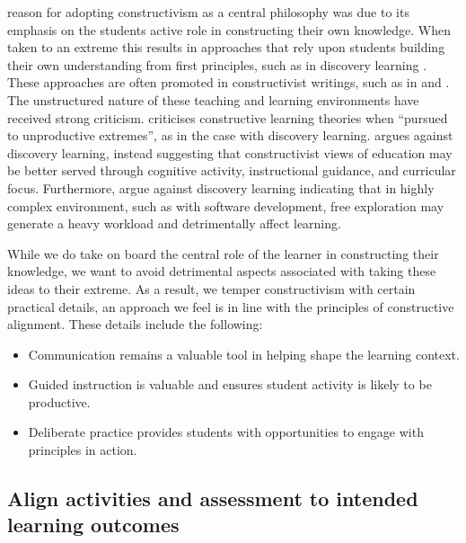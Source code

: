 \citet{Biggs:1996c} reason for adopting constructivism as a central philosophy was due to its emphasis on the students active role in constructing their own knowledge. When taken to an extreme this results in approaches that rely upon students building their own understanding from first principles, such as in discovery learning \cite{Bruner:1961}. These approaches are often promoted in constructivist writings, such as in \citet{Glasersfeld:1989} and \citet{Cunningham:1996}. The unstructured nature of these teaching and learning environments have received strong criticism. \citet{Anderson:1998} criticises constructive learning theories when ``pursued to unproductive extremes'', as in the case with discovery learning. \citet{Mayer:2004} argues against discovery learning, instead suggesting that constructivist views of education may be better served through cognitive activity, instructional guidance, and curricular focus. Furthermore, \citet{Kirschner:2006} argue against discovery learning indicating that in highly complex environment, such as with software development, free exploration may generate a heavy workload and detrimentally affect learning.

While we do take on board the central role of the learner in constructing their knowledge, we want to avoid detrimental aspects associated with taking these ideas to their extreme. As a result, we temper constructivism with certain practical details, an approach we feel is in line with the principles of constructive alignment. These details include the following:

\begin{itemize}
	\item Communication remains a valuable tool in helping shape the learning context.
	\item Guided instruction is valuable and ensures student activity is likely to be productive.
	\item Deliberate practice provides students with opportunities to engage with principles in action.
\end{itemize}


\subsection{Align activities and assessment to intended learning outcomes} %
\label{ssub:align_activities_and_assessment_to_intended_learning_outcomes_}

